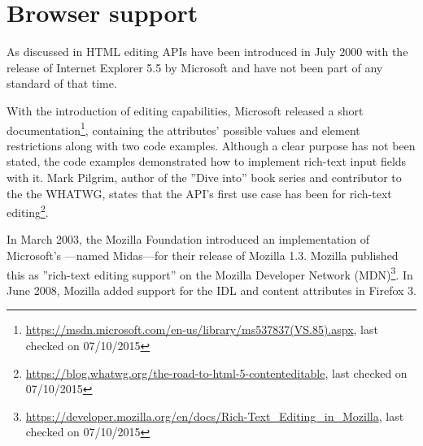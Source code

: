 

\section{Browser support}
\label{sec:edit_apis_browser_support}

As discussed in  HTML editing APIs have been introduced in July 2000 with the release of Internet Explorer 5.5 by Microsoft and have not been part of any standard of that time.


With the introduction of editing capabilities, Microsoft released a short documentation\footnote{\url{https://msdn.microsoft.com/en-us/library/ms537837(VS.85).aspx}, last checked on 07/10/2015}, containing the attributes' possible values and element restrictions along with two code examples. Although a clear purpose has not been stated, the code examples demonstrated how to implement rich-text input fields with it. Mark Pilgrim, author of the ''Dive into'' book series and contributor to the the WHATWG, states that the API's first use case has been for rich-text editing\footnote{\url{https://blog.whatwg.org/the-road-to-html-5-contenteditable}, last checked on 07/10/2015}. 




In March 2003, the Mozilla Foundation introduced an implementation of Microsoft's ---named Midas---for their release of Mozilla 1.3. Mozilla published this as ''rich-text editing support'' on the Mozilla Developer Network (MDN)\footnote{\url{https://developer.mozilla.org/en/docs/Rich-Text\_Editing\_in\_Mozilla}, last checked on 07/10/2015}. In June 2008, Mozilla added support for the  IDL and  content attributes in Firefox 3. 

